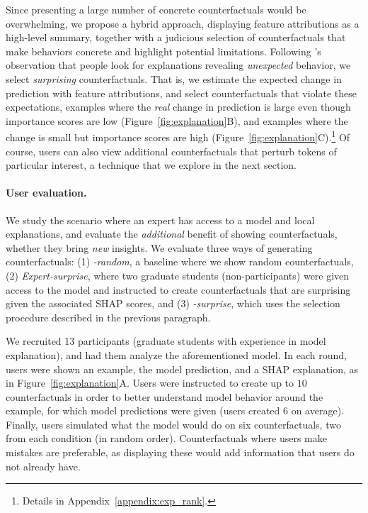 Since presenting a large number of concrete counterfactuals would be overwhelming, we propose a hybrid approach, displaying feature attributions as a high-level summary, together with a judicious selection of \sysname counterfactuals that make behaviors concrete and highlight potential limitations.
Following \citet{miller}'s observation that people look for explanations revealing \emph{unexpected} behavior, we select \emph{surprising} counterfactuals.
That is, we estimate the expected change in prediction with feature attributions, and select counterfactuals that violate these expectations, \ie examples where the \emph{real} change in prediction is large even though importance scores are low (Figure~\ref{fig:explanation}B), and examples where the change is small but importance scores are high (Figure~\ref{fig:explanation}C).\footnote{
Details in Appendix~\ref{appendix:exp_rank}.} 
Of course, users can also view additional counterfactuals that perturb tokens of particular interest, a technique that we explore in the next section.


\newcommand{\cshap}{\emph{\sysname-surprise}\xspace}
\newcommand{\crandom}{\emph{\sysname-random}\xspace}
\newcommand{\chuman}{\emph{Expert-surprise}\xspace}

\paragraph{User evaluation.} We study the scenario where an expert has access to a model and local explanations, and evaluate the \emph{additional} benefit of showing counterfactuals, \ie whether they bring \emph{new} insights. 
We evaluate three ways of generating counterfactuals: (1) \crandom, a baseline where we show random \sysname{} counterfactuals, (2) \chuman, where two graduate students (non-participants) were given access to the model and instructed to create counterfactuals that are surprising given the associated SHAP scores, and (3) \cshap, which uses the selection procedure described in the previous paragraph.

We recruited 13 participants (graduate students with experience in model explanation), and had them analyze the aforementioned \qqp model. In each round, users were shown an example, the model prediction, and a SHAP explanation, as in Figure~\ref{fig:explanation}A. Users were instructed to create up to $10$ counterfactuals in order to better understand model behavior around the example, for which model predictions were given (users created $6$ on average). 
Finally, users simulated what the model would do on six counterfactuals, two from each condition (in random order). Counterfactuals where users make mistakes are preferable, as displaying these would add information that users do not already have.



